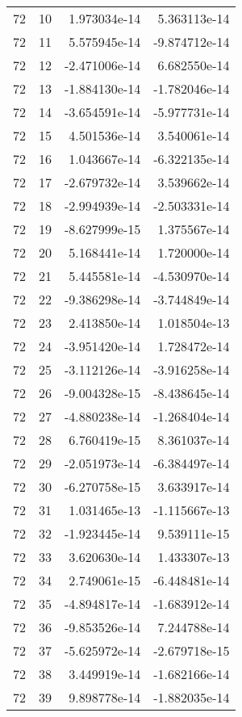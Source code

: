 \begin{tabular}{rrrr}
  72 &   10 &  1.973034e-14 &  5.363113e-14 \\
  72 &   11 &  5.575945e-14 & -9.874712e-14 \\
  72 &   12 & -2.471006e-14 &  6.682550e-14 \\
  72 &   13 & -1.884130e-14 & -1.782046e-14 \\
  72 &   14 & -3.654591e-14 & -5.977731e-14 \\
  72 &   15 &  4.501536e-14 &  3.540061e-14 \\
  72 &   16 &  1.043667e-14 & -6.322135e-14 \\
  72 &   17 & -2.679732e-14 &  3.539662e-14 \\
  72 &   18 & -2.994939e-14 & -2.503331e-14 \\
  72 &   19 & -8.627999e-15 &  1.375567e-14 \\
  72 &   20 &  5.168441e-14 &  1.720000e-14 \\
  72 &   21 &  5.445581e-14 & -4.530970e-14 \\
  72 &   22 & -9.386298e-14 & -3.744849e-14 \\
  72 &   23 &  2.413850e-14 &  1.018504e-13 \\
  72 &   24 & -3.951420e-14 &  1.728472e-14 \\
  72 &   25 & -3.112126e-14 & -3.916258e-14 \\
  72 &   26 & -9.004328e-15 & -8.438645e-14 \\
  72 &   27 & -4.880238e-14 & -1.268404e-14 \\
  72 &   28 &  6.760419e-15 &  8.361037e-14 \\
  72 &   29 & -2.051973e-14 & -6.384497e-14 \\
  72 &   30 & -6.270758e-15 &  3.633917e-14 \\
  72 &   31 &  1.031465e-13 & -1.115667e-13 \\
  72 &   32 & -1.923445e-14 &  9.539111e-15 \\
  72 &   33 &  3.620630e-14 &  1.433307e-13 \\
  72 &   34 &  2.749061e-15 & -6.448481e-14 \\
  72 &   35 & -4.894817e-14 & -1.683912e-14 \\
  72 &   36 & -9.853526e-14 &  7.244788e-14 \\
  72 &   37 & -5.625972e-14 & -2.679718e-15 \\
  72 &   38 &  3.449919e-14 & -1.682166e-14 \\
  72 &   39 &  9.898778e-14 & -1.882035e-14 \\

\end{tabular}
